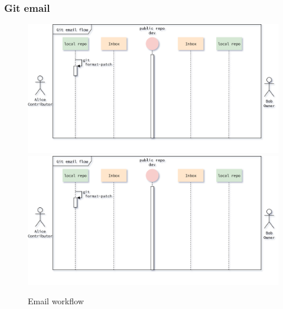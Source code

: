 \begin{frame}[noframenumbering]
    \frametitle{Git email}
    \addtocounter{page}{-1}
    \begin{figure}
        \begin{center}
            {
                \includegraphics[height=0.7\textheight,keepaspectratio]{./images/EmailWorkflow_PrepareFirstPatch.png}
            }
            {
                \includegraphics[height=0.75\textheight,keepaspectratio]{./images/EmailWorkflow_PrepareFirstPatch.png}
            }
            \caption{Email workflow}
        \end{center}
    \end{figure}
\end{frame}

